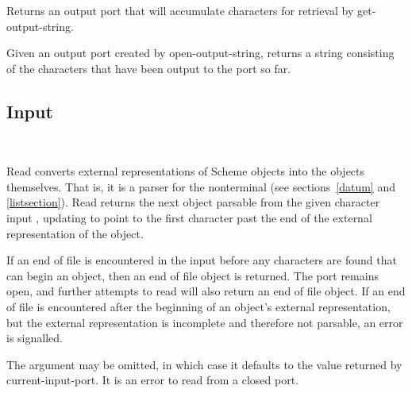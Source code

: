 \begin{entry}{%
}

Returns an output port that will accumulate characters for retrieval
by {\cf get-output-string}.

\end{entry}

\begin{entry}{%
}

Given an output port created by {\cf open-output-string}, returns a
string consisting of the characters that have been output to the port
so far.
\end{entry}


\subsection{Input}
\label{inputsection}

\noindent \hbox{ }  %
\vspace{-5ex}

\begin{entry}{%
}

{\cf Read} converts external representations of Scheme objects into the
objects themselves.  That is, it is a parser for the nonterminal
 (see sections~\ref{datum} and
\ref{listsection}).  {\cf Read} returns the next
object parsable from the given character input , updating
 to point to
the first character past the end of the external representation of the object.

\vest If an end of file is encountered in the input before any
characters are found that can begin an object, then an end of file
object is returned.  \todo{} The port remains open, and further attempts
to read will also return an end of file object.  If an end of file is
encountered after the beginning of an object's external representation,
but the external representation is incomplete and therefore not parsable,
an error is signalled.

The  argument may be omitted, in which case it defaults to the
value returned by {\cf current-input-port}.  It is an error to read from
a closed port.
\end{entry}

